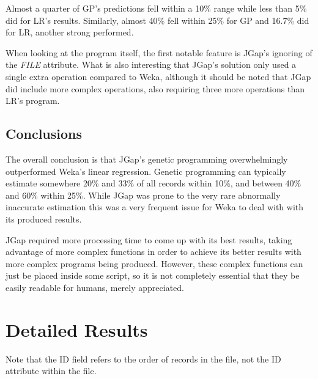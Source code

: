 \documentclass[11pt, a4paper]{article}
\begin{document}
Almost a quarter of GP's predictions fell within a 10\% range while less than
5\% did for LR's results. Similarly, almost 40\% fell within 25\% for GP and
16.7\% did for LR, another strong performed.

When looking at the program itself, the first notable feature is JGap's ignoring
of the \emph{FILE} attribute. What is also interesting that JGap's solution only
used a single extra operation compared to Weka, although it should be noted that
JGap did include more complex operations, also requiring three more operations
than LR's program.

\subsection{Conclusions} %
\label{sub:conclusions}
The overall conclusion is that JGap's genetic programming overwhelmingly
outperformed Weka's linear regression. Genetic programming can typically
estimate somewhere 20\% and 33\% of all records within 10\%, and between 40\%
and 60\% within 25\%. While JGap was prone to the very rare abnormally
inaccurate estimation this was a very frequent issue for Weka to deal with with
its produced results. 

JGap required more processing time to come up with its best results, taking
advantage of more complex functions in order to achieve its better results with
more complex programs being produced. However, these complex functions can just
be placed inside some script, so it is not completely essential that they be
easily readable for humans, merely appreciated. 

\newpage
\appendix
\section{Detailed Results} %
\label{sec:detailed_results}
Note that the ID field refers to the order of records in the file, not the ID
attribute within the file.





 
\end{document}

